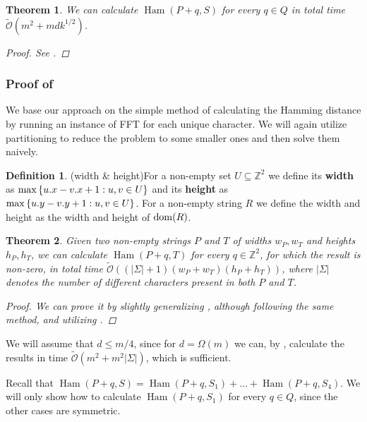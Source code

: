\documentclass[11pt]{article}
\newcommand{\Z}{\mathbb{Z}}
\newcommand{\tO}{\tilde{\mathcal{O}}}
\newcommand{\set}[1]{\left\lbrace #1 \right\rbrace}
\theoremstyle{plain}
\newtheorem{theorem}{Theorem}
\theoremstyle{definition}
\newtheorem{definition}{Definition}
\theoremstyle{remark}
\DeclareMathOperator*{\Ham}{Ham}
\begin{document}
\begin{theorem}\label{dense_algo}
	We can calculate $\Ham(P + q, S)$ for every $q \in Q$ in total time $\tO(m^2 + mdk^{1/2})$.
	\begin{proof} See . \end{proof}
\end{theorem}


\subsubsection{Proof of } \label{sigma_border_proof}

We base our approach on the simple method of calculating the Hamming distance by running an instance of FFT for each unique character.
We will again utilize partitioning to reduce the problem to some smaller ones and then solve them naively.

\begin{definition}(width \& height)\label{width_and_height_definition}
	For a non-empty set $U \subseteq \Z^2$ we define its \textbf{width} as $\max\set{\x{u} - \x{v} + 1 : u, v \in U}$
	and its \textbf{height} as $\max\set{\y{u} - \y{v} + 1 : u, v \in U}$.
	For a non-empty string $R$ we define the width and height as the width and height of $\operatorname*{dom}(R)$.
\end{definition}

\begin{theorem}\label{general_fft}
	Given two non-empty strings $P$ and $T$ of widths $w_P, w_T$ and heights $h_P, h_T$, we can calculate $\Ham(P + q, T)$ for every $q \in \Z^2$, for which the result is non-zero, in total time $\tO((|\Sigma| + 1)(w_P + w_T)(h_P + h_T))$, where $|\Sigma|$ denotes the number of different characters present in both $P$ and $T$.
	\begin{proof}
		We can prove it by slightly generalizing , although following the same method, and utilizing .
	\end{proof}
\end{theorem}

We will assume that $d \le m / 4$, since for $d = \Omega(m)$ we can, by , calculate the results in time $\tO(m^2 + m^2|\Sigma|)$, which is sufficient.

Recall that 
$\Ham(P + q, S) = \Ham(P + q, S_1) + \dots + \Ham(P + q, S_4)$.
We will only show how to calculate $\Ham(P + q, S_1)$ for every $q \in Q$, since the other cases are symmetric.
\end{document}
